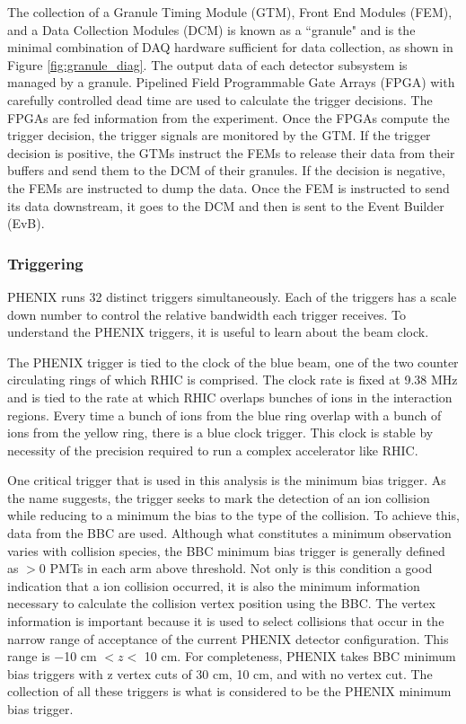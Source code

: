 The collection of a  Granule Timing Module (GTM), Front End Modules (FEM), and a Data Collection Modules (DCM) is known as a ``granule" and is the minimal combination of DAQ hardware sufficient for data collection, as shown in Figure \ref{fig:granule_diag}. The output data of each detector subsystem is managed by a granule. Pipelined Field Programmable Gate Arrays (FPGA) with carefully controlled dead time are used to calculate the trigger decisions. The FPGAs are fed information from the experiment. Once the FPGAs compute the trigger decision, the trigger signals are monitored by the GTM. If the trigger decision is positive, the GTMs instruct the FEMs to release their data from their buffers and send them to the DCM of their granules. If the decision is negative, the FEMs are instructed to dump the data.  Once the FEM is instructed to send its data downstream, it goes to the DCM and then is sent to the Event Builder (EvB).

\subsubsection{Triggering}
PHENIX runs 32 distinct triggers simultaneously. Each of the triggers has a scale down number to control the relative bandwidth each trigger receives. To understand the PHENIX triggers, it is useful to learn about the beam clock.

The PHENIX trigger is tied to the clock of the blue beam, one of the two counter circulating rings of which RHIC is comprised. The clock rate is fixed at 9.38 MHz and is tied to the rate at which RHIC overlaps bunches of ions in the interaction regions. Every time a bunch of ions from the blue ring overlap with a bunch of ions from the yellow ring, there is a blue clock trigger. This clock is stable by necessity of the precision required to run a complex accelerator like RHIC.

One critical trigger that is used in this analysis is the minimum bias trigger. As the name suggests, the trigger seeks to mark the detection of an ion collision while reducing to a minimum the bias to the type of the collision. To achieve this, data from the BBC are used. Although what constitutes a minimum observation varies with collision species, the BBC minimum bias trigger is generally defined as $>$0 PMTs in each arm above threshold. Not only is this condition a good indication that a ion collision occurred, it is also the minimum information necessary to calculate the collision vertex position using the BBC. The vertex information is important because it is used to select collisions that occur in the narrow range of acceptance of the current PHENIX detector configuration. This range is $-$10 cm $< z<$ 10 cm. For completeness, PHENIX takes BBC minimum bias triggers with z vertex cuts of 30 cm, 10 cm, and with no vertex cut. The collection of all these triggers is what is considered to be the PHENIX minimum bias trigger.

